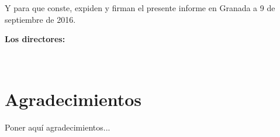 \vspace{0.5cm}

Y para que conste, expiden y firman el presente informe en Granada a 9 de septiembre de 2016.

\vspace{1cm}

\textbf{Los directores:}

\vspace{5cm}

\noindent \textbf{\myProf \ \ \ \ \ \ \myOtherProf}

\chapter*{Agradecimientos}
\thispagestyle{empty}

       \vspace{1cm}


Poner aquí agradecimientos...

